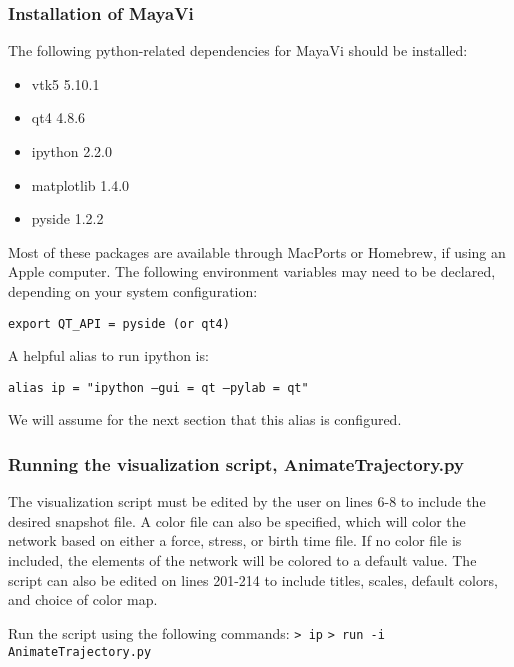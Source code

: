 \documentclass[11pt, oneside]{article}   	%
\begin{document}
\subsubsection{Installation of MayaVi}

The following python-related dependencies for MayaVi should be installed:
\begin{itemize}
\item vtk5 5.10.1
\item qt4 4.8.6
\item ipython 2.2.0
\item matplotlib 1.4.0
\item pyside 1.2.2
\end{itemize}

\noindent Most of these packages are available through MacPorts or Homebrew, if using an Apple computer. The following environment variables
may need to be declared, depending on your system configuration:\newline

\texttt{export QT\_API = pyside (or qt4)}\newline

\noindent A helpful alias to run ipython is:\newline

\texttt{alias ip = "ipython --gui = qt --pylab = qt"}\newline

\noindent We will assume for the next section that this alias is configured.


\subsubsection{Running the visualization script, AnimateTrajectory.py}

The visualization script must be edited by the user on lines 6-8 to include the desired snapshot file. A color file can also be specified, which will color the network based on either a force, stress, or birth time file. If no color file is included, the elements of the network will be colored to a default value. The script can also be edited on lines 201-214 to include titles, scales, default colors, and choice of color map. \newline

\noindent Run the script using the following commands:\newline\newline
\indent\texttt{> ip}\newline
\indent\texttt{> run -i AnimateTrajectory.py}\newline
\end{document}
